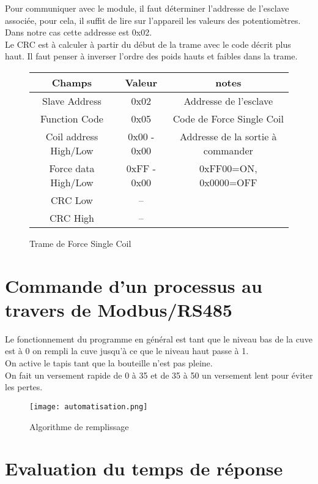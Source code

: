 \documentclass[oneside,a4paper,12pt]{article}
\begin{document}
	Pour communiquer avec le module, il faut déterminer l'addresse de l'esclave associée, pour cela, il suffit de lire sur l'appareil les valeurs des potentiomètres. Dans notre cas cette addresse est 0x02.\\
	
	Le CRC est à calculer à partir du début de la trame avec le code décrit plus haut. Il faut penser à inverser l'ordre des poids hauts et faibles dans la trame.\\
	
	\begin{figure}[h]
		\begin{center}
			\begin{tabular}{|c|c|c|}
				\hline
				Champs & Valeur & notes\\
				\hline
				Slave Address & 0x02 & Addresse de l'esclave\\
				\hline
				Function Code & 0x05 & Code de Force Single Coil\\
				\hline
				Coil address High/Low & 0x00 - 0x00 & Addresse de la sortie à commander\\
				\hline
				Force data High/Low & 0xFF - 0x00 & 0xFF00=ON, 0x0000=OFF\\
				\hline
				CRC Low & -- & \\
				\hline
				CRC High & -- & \\
				\hline
			\end{tabular}
		\end{center}
		\caption{Trame de Force Single Coil}
	\end{figure}
	
	\newpage
	\section{Commande d'un processus au travers de Modbus/RS485}
	
	Le fonctionnement du programme en général est tant que  le niveau bas de la cuve est à 0 on rempli la cuve jusqu'à ce que le niveau haut passe à 1.
\\
	On active le tapis tant que la bouteille n'est pas pleine.
\\
	On fait un versement rapide de 0 à 35 et de 35 à 50 un versement lent pour éviter les pertes.\\
	\begin{figure}[h]
		\centering
		\texttt{[image: automatisation.png]}
		\caption{Algorithme de remplissage}
	\end{figure}
	
	\section{Evaluation du temps de réponse}
	
\end{document}
